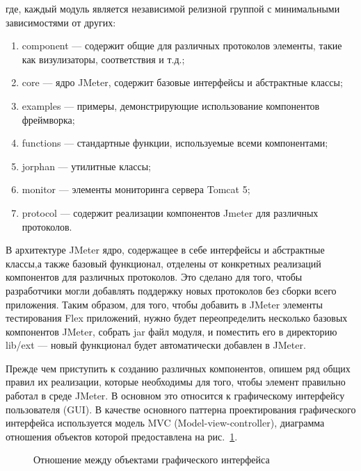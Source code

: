 где, каждый модуль является независимой релизной группой с минимальными зависимостями от других:
\begin{enumerate}
\item component --- содержит общие для различных протоколов элементы, такие как визулизаторы,
соответствия и т.д.;
\item core --- ядро JMeter, содержит базовые интерфейсы и абстрактные классы;
\item examples --- примеры, демонстрирующие использование компонентов фреймворка;
\item functions --- стандартные функции, используемые всеми компонентами;
\item jorphan --- утилитные классы;
\item monitor --- элементы мониторинга сервера Tomcat 5;
\item protocol --- содержит реализации компонентов Jmeter для различных протоколов.
\end{enumerate}

В архитектуре JMeter ядро, содержащее в себе интерфейсы и абстрактные классы,а также базовый функционал,
отделены от конкретных реализаций компонентов для различных протоколов. Это сделано для того, чтобы разработчики
могли добавлять поддержку новых протоколов без сборки всего приложения. Таким образом, для того, чтобы добавить
в JMeter элементы тестирования Flex приложений, нужно будет переопределить несколько базовых
компонентов JMeter, собрать jar файл модуля, и поместить его в директорию lib/ext --- новый функционал будет
автоматически добавлен в JMeter.

Прежде чем приступить к созданию различных компонентов, опишем ряд общих правил их реализации,
которые необходимы для того, чтобы элемент правильно работал в среде JMeter. В основном это относится к
графическому интерфейсу пользователя (GUI). В качестве основного паттерна проектирования графического
интерфейса используется модель MVC (Model-view-controller), диаграмма отношения объектов которой предоставлена
на рис.~\ref{ris:Diagram2.png}.

\begin{figure}[ht]
\caption{Отношение между объектами графического интерфейса}
\label{ris:Diagram2.png}
\end{figure}

